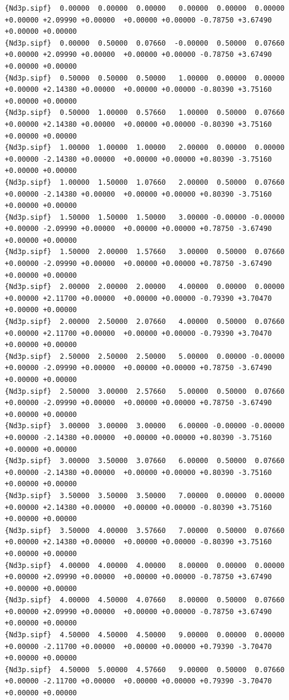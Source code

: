 {\begin{verbatim}
{Nd3p.sipf}  0.00000  0.00000  0.00000   0.00000  0.00000  0.00000   +0.00000 +2.09990 +0.00000  +0.00000 +0.00000 -0.78750 +3.67490 +0.00000 +0.00000
{Nd3p.sipf}  0.00000  0.50000  0.07660  -0.00000  0.50000  0.07660   +0.00000 +2.09990 +0.00000  +0.00000 +0.00000 -0.78750 +3.67490 +0.00000 +0.00000
{Nd3p.sipf}  0.50000  0.50000  0.50000   1.00000  0.00000  0.00000   +0.00000 +2.14380 +0.00000  +0.00000 +0.00000 -0.80390 +3.75160 +0.00000 +0.00000
{Nd3p.sipf}  0.50000  1.00000  0.57660   1.00000  0.50000  0.07660   +0.00000 +2.14380 +0.00000  +0.00000 +0.00000 -0.80390 +3.75160 +0.00000 +0.00000
{Nd3p.sipf}  1.00000  1.00000  1.00000   2.00000  0.00000  0.00000   +0.00000 -2.14380 +0.00000  +0.00000 +0.00000 +0.80390 -3.75160 +0.00000 +0.00000
{Nd3p.sipf}  1.00000  1.50000  1.07660   2.00000  0.50000  0.07660   +0.00000 -2.14380 +0.00000  +0.00000 +0.00000 +0.80390 -3.75160 +0.00000 +0.00000
{Nd3p.sipf}  1.50000  1.50000  1.50000   3.00000 -0.00000 -0.00000   +0.00000 -2.09990 +0.00000  +0.00000 +0.00000 +0.78750 -3.67490 +0.00000 +0.00000
{Nd3p.sipf}  1.50000  2.00000  1.57660   3.00000  0.50000  0.07660   +0.00000 -2.09990 +0.00000  +0.00000 +0.00000 +0.78750 -3.67490 +0.00000 +0.00000
{Nd3p.sipf}  2.00000  2.00000  2.00000   4.00000  0.00000  0.00000   +0.00000 +2.11700 +0.00000  +0.00000 +0.00000 -0.79390 +3.70470 +0.00000 +0.00000
{Nd3p.sipf}  2.00000  2.50000  2.07660   4.00000  0.50000  0.07660   +0.00000 +2.11700 +0.00000  +0.00000 +0.00000 -0.79390 +3.70470 +0.00000 +0.00000
{Nd3p.sipf}  2.50000  2.50000  2.50000   5.00000  0.00000 -0.00000   +0.00000 -2.09990 +0.00000  +0.00000 +0.00000 +0.78750 -3.67490 +0.00000 +0.00000
{Nd3p.sipf}  2.50000  3.00000  2.57660   5.00000  0.50000  0.07660   +0.00000 -2.09990 +0.00000  +0.00000 +0.00000 +0.78750 -3.67490 +0.00000 +0.00000
{Nd3p.sipf}  3.00000  3.00000  3.00000   6.00000 -0.00000 -0.00000   +0.00000 -2.14380 +0.00000  +0.00000 +0.00000 +0.80390 -3.75160 +0.00000 +0.00000
{Nd3p.sipf}  3.00000  3.50000  3.07660   6.00000  0.50000  0.07660   +0.00000 -2.14380 +0.00000  +0.00000 +0.00000 +0.80390 -3.75160 +0.00000 +0.00000
{Nd3p.sipf}  3.50000  3.50000  3.50000   7.00000  0.00000  0.00000   +0.00000 +2.14380 +0.00000  +0.00000 +0.00000 -0.80390 +3.75160 +0.00000 +0.00000
{Nd3p.sipf}  3.50000  4.00000  3.57660   7.00000  0.50000  0.07660   +0.00000 +2.14380 +0.00000  +0.00000 +0.00000 -0.80390 +3.75160 +0.00000 +0.00000
{Nd3p.sipf}  4.00000  4.00000  4.00000   8.00000  0.00000  0.00000   +0.00000 +2.09990 +0.00000  +0.00000 +0.00000 -0.78750 +3.67490 +0.00000 +0.00000
{Nd3p.sipf}  4.00000  4.50000  4.07660   8.00000  0.50000  0.07660   +0.00000 +2.09990 +0.00000  +0.00000 +0.00000 -0.78750 +3.67490 +0.00000 +0.00000
{Nd3p.sipf}  4.50000  4.50000  4.50000   9.00000  0.00000  0.00000   +0.00000 -2.11700 +0.00000  +0.00000 +0.00000 +0.79390 -3.70470 +0.00000 +0.00000
{Nd3p.sipf}  4.50000  5.00000  4.57660   9.00000  0.50000  0.07660   +0.00000 -2.11700 +0.00000  +0.00000 +0.00000 +0.79390 -3.70470 +0.00000 +0.00000
\end{verbatim}
}

